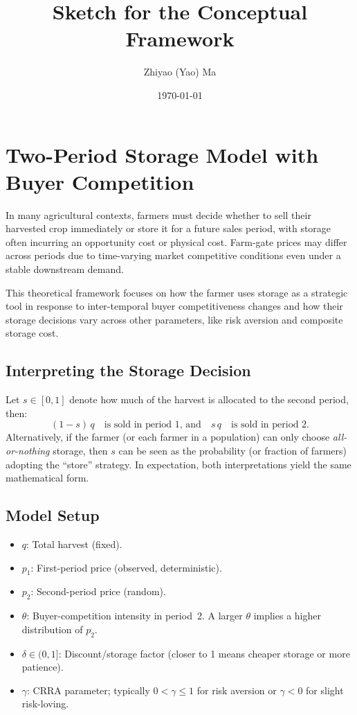 \documentclass[12pt]{article}
\title{Sketch for the Conceptual Framework}
\author[1]{Zhiyao (Yao) Ma}
\affil[1]{UC Davis}
\date{\today}
\begin{document}
\maketitle
\tableofcontents
\newpage


\section{Two-Period Storage Model with Buyer Competition}

In many agricultural contexts, farmers must decide whether to sell their harvested crop immediately or store it for a future sales period, with storage often incurring an opportunity cost or physical cost. Farm-gate prices may differ across periods due to time-varying market competitive conditions even under a stable downstream demand.

This theoretical framework focuses on how the farmer uses storage as a strategic tool in response to inter-temporal buyer competitiveness changes and how their storage decisions vary across other parameters, like risk aversion and composite storage cost.

\subsection{Interpreting the Storage Decision }

Let \(s\in [0,1]\) denote how much of the harvest is allocated to the second period, then:
\[
(1-s)\,q 
\quad\text{is sold in period 1, and}\quad 
s\,q 
\quad\text{is sold in period 2.}
\]
Alternatively, if the farmer (or each farmer in a population) can only choose \emph{all-or-nothing} storage, then \(s\) can be seen as the probability (or fraction of farmers) adopting the ``store'' strategy. In expectation, both interpretations yield the same mathematical form.

\subsection{Model Setup}

\begin{itemize}
    \item \(q\): Total harvest (fixed).
    \item \(p_1\): First-period price (observed, deterministic).
    \item \(p_2\): Second-period price (random).
    \item \(\theta\): Buyer-competition intensity in period~2. A larger \(\theta\) implies a higher distribution of \(p_2\).
    \item \(\delta \in (0,1]\): Discount/storage factor (closer to 1 means cheaper storage or more patience).
    \item \(\gamma\): CRRA parameter; typically \(0< \gamma \le 1\) for risk aversion or \(\gamma<0\) for slight risk-loving.
\end{itemize}
\end{document}
